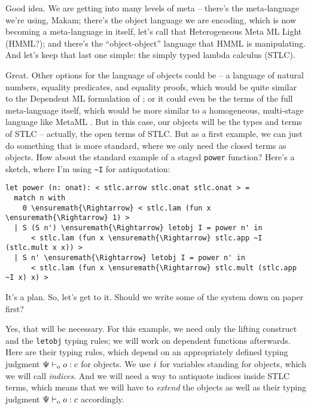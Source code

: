 \heroADVISOR{} Good idea. We are getting into many levels of meta -- there's
the meta-language we're using, Makam; there's the object language we are
encoding, which is now becoming a meta-language in itself, let's call
that Heterogeneous Meta ML Light (HMML?); and there's the
``object-object'' language that HMML is manipulating. And let's keep
that last one simple: the simply typed lambda calculus (STLC).

\heroSTUDENT{} Great. Other options for the language of objects could be -- a
language of natural numbers, equality predicates, and equality proofs,
which would be quite similar to the Dependent ML formulation of
\citet{licata2005formulation}; or it could even be the terms of the full
meta-language itself, which would be more similar to a homogeneous,
multi-stage language like MetaML \citep{metaml-main-reference}. But in
this case, our objects will be the types and terms of STLC -- actually,
the open terms of STLC. But as a first example, we can just do something
that is more standard, where we only need the closed terms as objects.
How about the standard example of a staged \texttt{power} function?
Here's a sketch, where I'm using \texttt{\textasciitilde{}I} for
antiquotation:

\begin{verbatim}
let power (n: onat): < stlc.arrow stlc.onat stlc.onat > =
  match n with
    0 \ensuremath{\Rightarrow} < stlc.lam (fun x \ensuremath{\Rightarrow} 1) >
  | S (S n') \ensuremath{\Rightarrow} letobj I = power n' in
      < stlc.lam (fun x \ensuremath{\Rightarrow} stlc.app ~I (stlc.mult x x)) >
  | S n' \ensuremath{\Rightarrow} letobj I = power n' in
      < stlc.lam (fun x \ensuremath{\Rightarrow} stlc.mult (stlc.app ~I x) x) >
\end{verbatim}

\heroADVISOR{} It's a plan. So, let's get to it. Should we write some of the
system down on paper first?

\heroSTUDENT{} Yes, that will be necessary. For this example, we need only the
lifting construct and the \texttt{letobj} typing rules; we will work on
dependent functions afterwards. Here are their typing rules, which
depend on an appropriately defined typing judgment \(\Psi \vdash_{\text{o}} o : c\)
for objects. We use \(i\) for variables standing for objects,
which we will call \emph{indices}. And we will need a way to antiquote
indices inside STLC terms, which means that we will have to
\emph{extend} the objects as well as their typing judgment
\(\Psi \vdash_{\text{o}} o : c\) accordingly.

